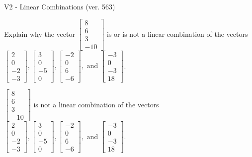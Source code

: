 \begin{exercise}
  \begin{exerciseTitle}V2 - Linear Combinations (ver. 563)\end{exerciseTitle}
  \begin{exerciseStatement}
    Explain why the vector \(\left[\begin{array}{c}
8 \\
6 \\
3 \\
-10
\end{array}\right]\)  is or is not a linear 
	combination of the vectors \(\left[\begin{array}{c}
2 \\
0 \\
-2 \\
-3
\end{array}\right] , \left[\begin{array}{c}
3 \\
0 \\
-5 \\
0
\end{array}\right] , \left[\begin{array}{c}
-2 \\
0 \\
6 \\
-6
\end{array}\right] , \text{ and } \left[\begin{array}{c}
-3 \\
0 \\
-3 \\
18
\end{array}\right]\).
	


  \end{exerciseStatement}
  \begin{exerciseAnswer}
   \(\left[\begin{array}{c}
8 \\
6 \\
3 \\
-10
\end{array}\right]\) 
  	 is not  
	a linear combination of the vectors \(\left[\begin{array}{c}
2 \\
0 \\
-2 \\
-3
\end{array}\right] , \left[\begin{array}{c}
3 \\
0 \\
-5 \\
0
\end{array}\right] , \left[\begin{array}{c}
-2 \\
0 \\
6 \\
-6
\end{array}\right] , \text{ and } \left[\begin{array}{c}
-3 \\
0 \\
-3 \\
18
\end{array}\right]\).


\end{exerciseAnswer}
\end{exercise}
